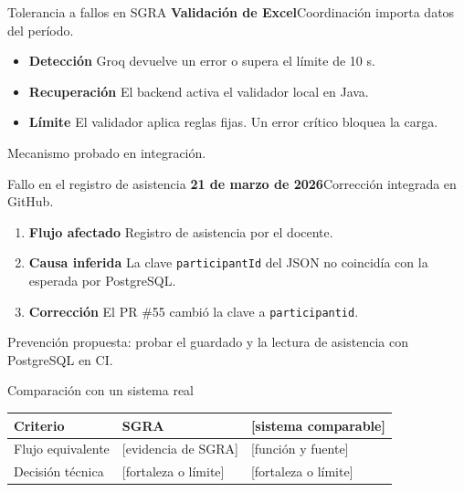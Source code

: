 \documentclass[aspectratio=169,12pt]{beamer}
\newif\ifguias
\newcommand{\turno}{}
\newcommand{\bloque}[1]{\renewcommand{\turno}{#1}}
\newcommand{\campo}[1]{\textcolor{Azul}{[#1]}}
\newcommand{\guia}[1]{\ifguias\par\medskip
  \begin{beamercolorbox}[wd=\linewidth,sep=1.05ex]{guia}
    \small\textbf{Para completar}\quad #1
  \end{beamercolorbox}\fi}
\begin{document}
\bloque{Byron Loor}
\begin{frame}{Tolerancia a fallos en SGRA}
  \textbf{Validación de Excel}\quad Coordinación importa datos del período.
  \medskip
  \begin{itemize}
    \item \textbf{Detección} \quad Groq devuelve un error o supera el límite de 10 s.
    \item \textbf{Recuperación} \quad El backend activa el validador local en Java.
    \item \textbf{Límite} \quad El validador aplica reglas fijas. Un error crítico bloquea la carga.
  \end{itemize}
  \medskip
  {\small Mecanismo probado en integración. \cite[pp.~66 y 142]{informeSgra}}
\end{frame}

\bloque{Byron Loor}
\begin{frame}{Fallo en el registro de asistencia}
  \textbf{21 de marzo de 2026}\quad Corrección integrada en GitHub. \cite{sgraAsistencia}
  \medskip
  \begin{enumerate}
    \item \textbf{Flujo afectado} \quad Registro de asistencia por el docente.
    \item \textbf{Causa inferida} \quad La clave \texttt{participantId} del JSON no coincidía con la esperada por PostgreSQL.
    \item \textbf{Corrección} \quad El PR \#55 cambió la clave a \texttt{participantid}.
  \end{enumerate}
  \medskip
  {\small Prevención propuesta: probar el guardado y la lectura de asistencia con PostgreSQL en CI.}
\end{frame}

\bloque{Integrante 4}
\begin{frame}{Comparación con un sistema real}
  \begin{tabularx}{\linewidth}{@{}lXX@{}}
    \toprule
    \textbf{Criterio} & \textbf{SGRA} & \textbf{\campo{sistema comparable}}\\
    \midrule
    Flujo equivalente & \campo{evidencia de SGRA} & \campo{función y fuente}\\[.4em]
    Decisión técnica & \campo{fortaleza o límite} & \campo{fortaleza o límite}\\
    \bottomrule
  \end{tabularx}
  \guia{Elige un sistema que cubra el mismo flujo académico. Cierra con una postura que mencione la ventaja y el costo de la decisión comparada.}
\end{frame}
\end{document}
